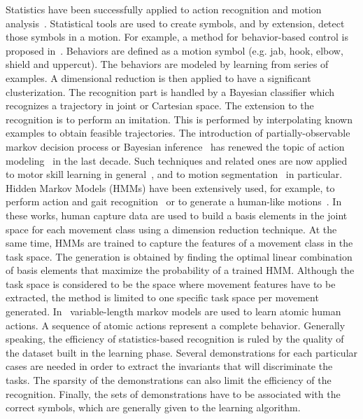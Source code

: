 \documentclass[journal]{IEEEtran}
\begin{document}
Statistics have been successfully applied
to action recognition and motion analysis~\cite{schaal03}.
Statistical tools are used to create symbols, and by extension, detect those
symbols in a motion. For example, a method for behavior-based control
is proposed in~\cite{drumwright03, drumwright04}. Behaviors are defined
as a motion symbol (e.g. jab, hook, elbow, shield and uppercut).
The behaviors are modeled by learning from series of examples.
A dimensional reduction is then applied to have a significant
clusterization.  The recognition part is handled by a Bayesian classifier which
recognizes a trajectory in joint or Cartesian space. The extension to the recognition
is to perform an imitation. This is performed by interpolating known examples to obtain
feasible trajectories.
The introduction of partially-observable markov decision process or Bayesian inference~\cite{pearl88} has
renewed the topic of action modeling~\cite{kaelbling98} in the last decade. Such
techniques and related ones are now applied to motor skill learning in
general~\cite{peters08}, and to motion segmentation~\cite{calinon10, inamura04} in particular.
Hidden Markov Models (HMMs) have been extensively used,
for example, to perform action and gait recognition~\cite{gu10} or to generate
a human-like motions~\cite{kwon08}. In these works, human capture data
are used to build a basis elements in the joint space for each movement class
using a dimension reduction technique. At the same time,
HMMs are trained to capture the features of a movement class in the task space. The generation
is obtained by finding the optimal linear combination of basis elements that maximize
the probability of a trained HMM. Although the task space is considered to be
the space where movement features have to be extracted, the method is limited to one
specific task space per movement generated.
In~\cite{liang09} variable-length markov models are used to learn atomic human actions. A sequence
of atomic actions represent a complete behavior.
Generally speaking, the efficiency of statistics-based recognition is ruled by the quality of the dataset built
in the learning phase.
Several demonstrations for each particular cases are needed in order to extract
the invariants that will discriminate the tasks. The sparsity of the demonstrations
can also limit the efficiency of the recognition. Finally, the sets of demonstrations
have to be associated with the correct symbols, which are generally given to the learning algorithm.
\end{document}
